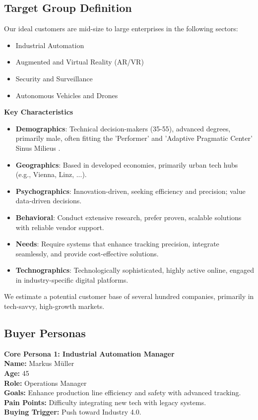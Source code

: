 \subsection{Target Group Definition}

Our ideal customers are mid-size to large enterprises in the following sectors:

\begin{itemize}
	\item Industrial Automation
	\item Augmented and Virtual Reality (AR/VR)
	\item Security and Surveillance
	\item Autonomous Vehicles and Drones
\end{itemize}

\textbf{Key Characteristics}

\begin{itemize}
	\item \textbf{Demographics}: Technical decision-makers (35-55), advanced degrees, primarily male, often fitting the 'Performer' and 'Adaptive Pragmatic Center' Sinus Milieus \cite{sinus_institut_2024}.
	\item \textbf{Geographics}: Based in developed economies, primarily urban tech hubs (e.g., Vienna, Linz, ...).
	\item \textbf{Psychographics}: Innovation-driven, seeking efficiency and precision; value data-driven decisions.
	\item \textbf{Behavioral}: Conduct extensive research, prefer proven, scalable solutions with reliable vendor support.
	\item \textbf{Needs}: Require systems that enhance tracking precision, integrate seamlessly, and provide cost-effective solutions.
	\item \textbf{Technographics}: Technologically sophisticated, highly active online, engaged in industry-specific digital platforms.
\end{itemize}

We estimate a potential customer base of several hundred companies, primarily in tech-savvy, high-growth markets.

\subsection{Buyer Personas}

\textbf{Core Persona 1: Industrial Automation Manager} \\
\textbf{Name:} Markus Müller \\
\textbf{Age:} 45 \\
\textbf{Role:} Operations Manager \\
\textbf{Goals:} Enhance production line efficiency and safety with advanced tracking. \\
\textbf{Pain Points:} Difficulty integrating new tech with legacy systems. \\
\textbf{Buying Trigger:} Push toward Industry 4.0.

